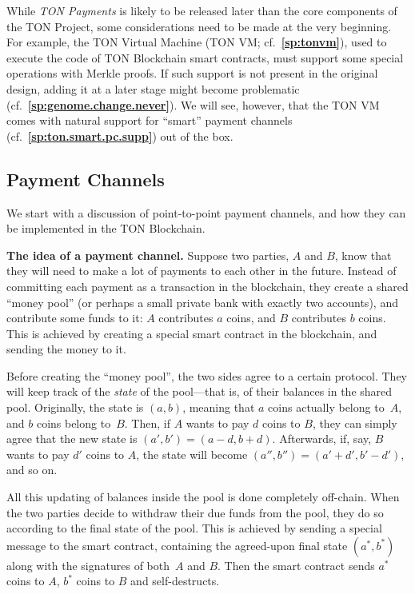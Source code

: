 \documentclass[12pt,oneside]{article}
\def\makepoint#1{\medbreak\noindent{\bf #1.\ }}
\def\nxsubpoint{\refstepcounter{subsubsection}%
  \smallbreak\makepoint{\thesubsubsection}}
\def\refpoint#1{{\rm\textbf{\ref{#1}}}}
\let\ptref=\refpoint
\def\embt(#1.){\textbf{#1.}}
\def\mysubsection#1{\subsection{#1}\fancyhead[C]{\small{\textsc{\textrm{\thesubsection.} #1}}}}
\begin{document}
While {\em TON Payments\/} is likely to be released later than the
core components of the TON Project, some considerations need to be
made at the very beginning. For example, the TON Virtual Machine (TON
VM; cf.~\ptref{sp:tonvm}), used to execute the code of TON Blockchain
smart contracts, must support some special operations with Merkle
proofs. If such support is not present in the original design, adding
it at a later stage might become problematic
(cf.~\ptref{sp:genome.change.never}). We will see, however, that the
TON VM comes with natural support for ``smart'' payment channels
(cf.~\ptref{sp:ton.smart.pc.supp}) out of the box.

\mysubsection{Payment Channels}

We start with a discussion of point-to-point payment channels, and how they can be implemented in the TON Blockchain.

\nxsubpoint \embt(The idea of a payment channel.)  Suppose two
parties, $A$ and $B$, know that they will need to make a lot of
payments to each other in the future. Instead of committing each
payment as a transaction in the blockchain, they create a shared
``money pool'' (or perhaps a small private bank with exactly two
accounts), and contribute some funds to it: $A$ contributes $a$
coins, and $B$ contributes $b$ coins. This is achieved by creating a
special smart contract in the blockchain, and sending the money to it.

Before creating the ``money pool'', the two sides agree to a certain
protocol. They will keep track of the {\em state\/} of the pool---that
is, of their balances in the shared pool. Originally, the state is
$(a,b)$, meaning that $a$ coins actually belong to~$A$, and $b$ coins
belong to~$B$. Then, if $A$ wants to pay $d$ coins to $B$, they can
simply agree that the new state is $(a',b')=(a-d,b+d)$. Afterwards,
if, say, $B$ wants to pay $d'$ coins to $A$, the state will become
$(a'',b'')=(a'+d',b'-d')$, and so on.

All this updating of balances inside the pool is done completely
off-chain. When the two parties decide to withdraw their due funds
from the pool, they do so according to the final state of the
pool. This is achieved by sending a special message to the smart
contract, containing the agreed-upon final state $(a^*,b^*)$ along
with the signatures of both~$A$ and $B$. Then the smart contract sends
$a^*$ coins to $A$, $b^*$ coins to $B$ and self-destructs.
\end{document}
